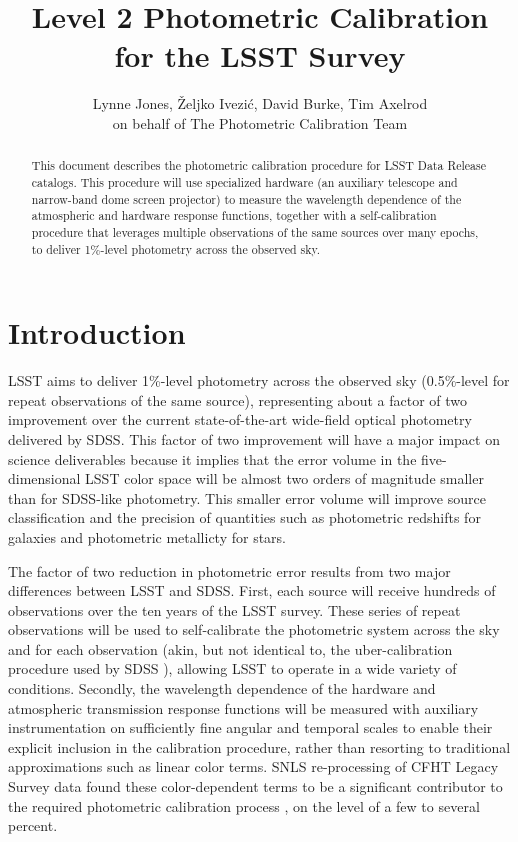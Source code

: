 \documentclass[12pt,preprint]{aastex}
\begin{document}
\title{Level 2 Photometric Calibration for the LSST Survey}

\author{
Lynne Jones, {\v Z}eljko Ivezi{\'c}, David Burke, Tim Axelrod \\
on behalf of 
The Photometric Calibration Team
}


\begin{abstract}
This document describes the photometric calibration procedure for LSST
Data Release catalogs. This procedure will use specialized hardware
(an auxiliary telescope and narrow-band dome screen projector) to
measure the wavelength dependence of the atmospheric and hardware
response functions, together with a self-calibration procedure that
leverages multiple observations of the same sources over many epochs,
to deliver 1\%-level photometry across the observed sky.
\end{abstract}

\tableofcontents

\section{Introduction}

LSST aims to deliver 1\%-level photometry across the observed sky
(0.5\%-level for repeat observations of the same source), 
representing about a factor of two improvement over the current
state-of-the-art wide-field optical photometry delivered by SDSS. This
factor of two improvement will have a major impact on science
deliverables because it implies that the error volume in the
five-dimensional LSST color space will be almost two orders of
magnitude smaller than for SDSS-like photometry. This smaller error
volume will improve source classification and the precision of quantities
such as photometric redshifts for galaxies and photometric metallicty
for stars.

The factor of two reduction in photometric error results from two major differences
between LSST and SDSS. First, each source will receive hundreds of
observations over the ten years of the LSST survey. These series of
repeat observations will be used to self-calibrate the photometric
system across the sky and for each observation (akin, but not
identical to, the uber-calibration procedure used by SDSS
\citep{Padmanabhan2008}), allowing LSST to operate in a wide variety
of conditions. Secondly, the wavelength dependence of the hardware and
atmospheric transmission response functions will be measured with
auxiliary instrumentation on sufficiently fine angular and temporal
scales to enable their explicit inclusion in the calibration
procedure, rather than resorting to traditional approximations such as
linear color terms. SNLS re-processing of CFHT Legacy Survey data
found these color-dependent terms to be a significant contributor to
the required photometric calibration process \citep{Regnault2009}, on
the level of a few to several percent. 
\end{document}
